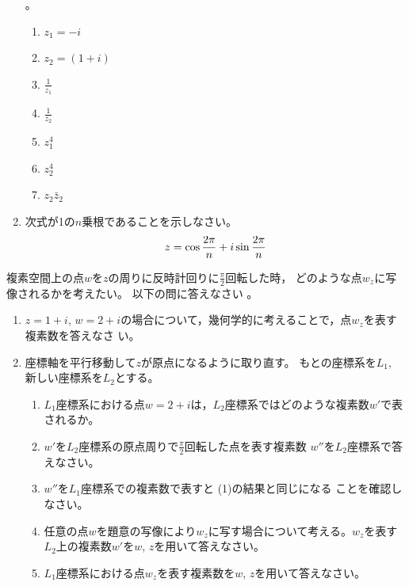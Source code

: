 \documentclass[twocolumn,11pt]{jarticle}
\begin{document}
\begin{enumerate}
{%
}。
  \begin{enumerate}
  \item\label{eitem:z1} $z_1=-i$
  \item\label{eitem:z2} $z_2=(1+i)$
  \item\label{eitem:1/z_1} $\displaystyle\frac{1}{z_1}$
  \item\label{eitem:1/z_2} $\displaystyle\frac{1}{z_2}$
  \item\label{eitem:z_1^4} $z_1^4$
  \item\label{eitem:z_2^4} $z_2^4$
  \item\label{eitem:z_2barz_2} $z_2\bar{z}_2$
  \end{enumerate}
\item 次式が1の$n$乗根であることを示しなさい。
  \begin{align}
    z=\cos\frac{2\pi}{n}+i\sin\frac{2\pi}{n}\notag
  \end{align}
\end{enumerate}

\nquestion
複素空間上の点$w$を$z$の周りに反時計回りに$\frac{\pi}{2}$回転した時，
どのような点$w_z$に写像されるかを考えたい。
以下の問に答えなさい
。
\begin{enumerate}
\item $z=1+i$, $w=2+i$の場合について，幾何学的に考えることで，点$w_z$を表す複素数を答えなさ
  い。
\item
  座標軸を平行移動して$z$が原点になるように取り直す。
  もとの座標系を$L_1$, 新しい座標系を$L_2$とする。
  \begin{enumerate}
    \item $L_1$座標系における点$w=2+i$は，$L_2$座標系ではどのような複素数$w'$で表されるか。
    \item $w'$を$L_2$座標系の原点周りで$\frac{\pi}{2}$回転した点を表す複素数
  $w''$を$L_2$座標系で答えなさい。
    \item $w''$を$L_1$座標系での複素数で表すと (1)の結果と同じになる
  ことを確認しなさい。
    \item 任意の点$w$を題意の写像により$w_z$に写す場合について考える。$w_z$を表す$L_2$上の複素数$w'$を$w$, $z$を用いて答えなさい。
  \item $L_1$座標系における点$w_z$を表す複素数を$w$, $z$を用いて答えなさい。
\end{enumerate}
\end{enumerate}
\end{document}
